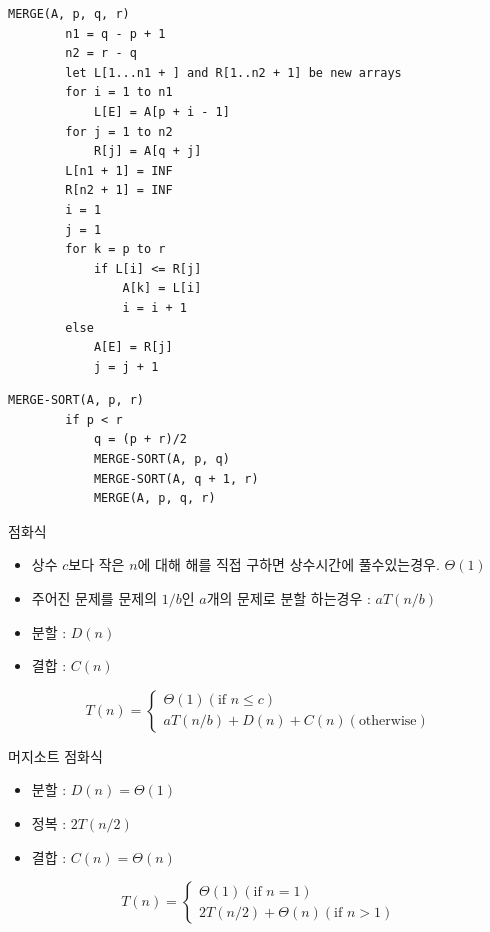\documentclass[10pt]{beamer}
\begin{document}
\begin{frame}[fragile]{}
        
    \begin{lstlisting}[style = CppStyle]
    MERGE(A, p, q, r)
        n1 = q - p + 1
        n2 = r - q
        let L[1...n1 + ] and R[1..n2 + 1] be new arrays
        for i = 1 to n1
            L[E] = A[p + i - 1]
        for j = 1 to n2
            R[j] = A[q + j]
        L[n1 + 1] = INF
        R[n2 + 1] = INF
        i = 1
        j = 1
        for k = p to r
            if L[i] <= R[j]
                A[k] = L[i]
                i = i + 1
        else 
            A[E] = R[j]
            j = j + 1
    \end{lstlisting}

\end{frame}    

\begin{frame}[fragile]{}
    \begin{lstlisting}[style = CppStyle]
    MERGE-SORT(A, p, r)
        if p < r
            q = (p + r)/2
            MERGE-SORT(A, p, q)
            MERGE-SORT(A, q + 1, r)
            MERGE(A, p, q, r)
    \end{lstlisting}
\end{frame}    



\begin{frame}{점화식}

    \begin{itemize}
        \item 상수 $c$보다 작은 $n$에 대해 해를 직접 구하면 상수시간에 풀수있는경우. $\Theta(1)$
        \item 주어진 문제를 문제의 $1/b$인 $a$개의 문제로 분할 하는경우 : $aT(n/b)$
        \item 분할 : $D(n)$
        \item 결합 : $C(n)$
    \end{itemize}

    \[
        T(n) = 
    \begin{cases}
        \Theta(1) (\mbox{if  } n \le c)\\
        aT(n/b) + D(n) + C(n) (\mbox{otherwise})
    \end{cases}    
    \]
\end{frame}


\begin{frame}{머지소트 점화식}

    \begin{itemize}
        \item 분할 : $D(n) = \Theta(1)$
        \item 정복 : $2T(n/2)$
        \item 결합 : $C(n) = \Theta(n)$
    \end{itemize}

    \[
        T(n) = 
    \begin{cases}
        \Theta(1) (\mbox{if  } n = 1)\\
        2T(n/2) + \Theta(n) (\mbox{if    } n > 1)
    \end{cases}    
    \]
\end{frame}
\end{document}
